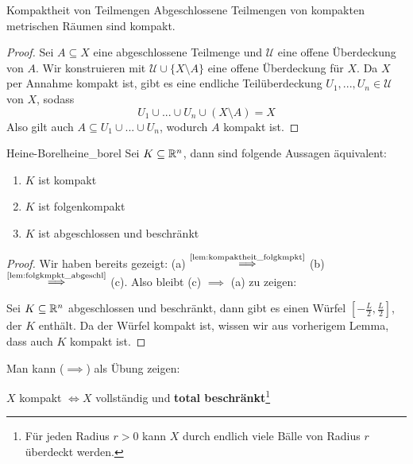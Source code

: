 \begin{lemma}{Kompaktheit von Teilmengen}{}
Abgeschlossene Teilmengen von kompakten metrischen Räumen sind kompakt.
\end{lemma}
\begin{proof}
Sei $A \subseteq X$ eine abgeschlossene Teilmenge und $\mathcal{U}$ eine offene Überdeckung von $A$. Wir konstruieren mit $\mathcal{U} \cup \{X \setminus A\}$ eine offene Überdeckung für $X$. Da $X$ per Annahme kompakt ist, gibt es eine endliche Teilüberdeckung $U_1, ..., U_n \in \mathcal{U}$ von $X$, sodass
$$U_1 \cup ... \cup U_n \cup (X \setminus A) = X$$
Also gilt auch $A \subseteq U_1 \cup ... \cup U_n$, wodurch $A$ kompakt ist.
\end{proof}

\begin{satz}{Heine-Borel}{heine_borel}
Sei $K \subseteq \mathbb{R}^n$, dann sind folgende Aussagen äquivalent:
\begin{enumerate}[label=(\alph*)]
    \item $K$ ist kompakt
    \item $K$ ist folgenkompakt
    \item $K$ ist abgeschlossen und beschränkt
\end{enumerate}
\end{satz}
\begin{proof}
Wir haben bereits gezeigt:
(a) $\stackrel{\text{\ref{lem:kompaktheit_folgkmpkt}}}{\implies}$ (b) $\stackrel{\text{\ref{lem:folgkmpkt_abgeschl}}}{\implies}$ (c). Also bleibt (c) $\implies$ (a) zu zeigen:

Sei $K \subseteq \mathbb{R}^n$ abgeschlossen und beschränkt, dann gibt es einen Würfel $[-\frac{L}{2}, \frac{L}{2}]$, der $K$ enthält. Da der Würfel kompakt ist, wissen wir aus vorherigem Lemma, dass auch $K$ kompakt ist.
\end{proof}

\begin{exercise}Man kann ($\implies$) als Übung zeigen:

$X$ kompakt $\iff X$ vollständig und \textbf{total beschränkt}\footnote{Für jeden Radius $r > 0$ kann $X$ durch endlich viele Bälle von Radius $r$ überdeckt werden.}
\end{exercise}

